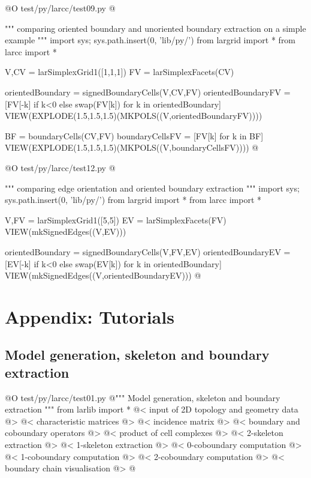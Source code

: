 \documentclass[11pt,oneside]{article}	%
\begin{document}
@O test/py/larcc/test09.py
@{""" comparing oriented boundary and unoriented boundary extraction on a simple example """
import sys; sys.path.insert(0, 'lib/py/')
from largrid import *
from larcc import *

V,CV = larSimplexGrid1([1,1,1])
FV = larSimplexFacets(CV)

orientedBoundary = signedBoundaryCells(V,CV,FV)
orientedBoundaryFV = [FV[-k] if k<0 else swap(FV[k]) for k in orientedBoundary]
VIEW(EXPLODE(1.5,1.5,1.5)(MKPOLS((V,orientedBoundaryFV))))

BF = boundaryCells(CV,FV)
boundaryCellsFV = [FV[k] for k in BF]
VIEW(EXPLODE(1.5,1.5,1.5)(MKPOLS((V,boundaryCellsFV))))
@}

@O test/py/larcc/test12.py
@{""" comparing edge orientation and oriented boundary extraction """
import sys; sys.path.insert(0, 'lib/py/')
from largrid import *
from larcc import *

V,FV = larSimplexGrid1([5,5])
EV = larSimplexFacets(FV)
VIEW(mkSignedEdges((V,EV)))

orientedBoundary = signedBoundaryCells(V,FV,EV)
orientedBoundaryEV = [EV[-k] if k<0 else swap(EV[k]) for k in orientedBoundary]
VIEW(mkSignedEdges((V,orientedBoundaryEV)))
@}



\appendix

\section{Appendix: Tutorials}


\subsection{Model generation, skeleton and boundary extraction}

@O test/py/larcc/test01.py
@{""" Model generation, skeleton and boundary extraction """
from larlib import *
@< input of 2D topology and geometry data @>
@< characteristic matrices @>
@< incidence matrix @>
@< boundary and coboundary operators @>
@< product of cell complexes @>
@< 2-skeleton extraction @>
@< 1-skeleton extraction  @>
@< 0-coboundary computation @>
@< 1-coboundary computation @>
@< 2-coboundary computation @>
@< boundary chain visualisation @>
@}
\end{document}
